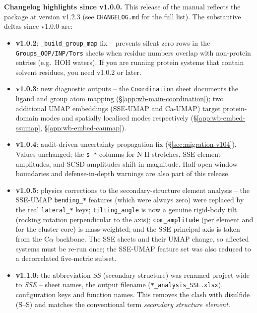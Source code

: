 \documentclass[11pt,a4paper,twoside]{article}
\theoremstyle{remark}
\begin{document}
\begin{infobox}
\textbf{Changelog highlights since v1.0.0.}
This release of the manual reflects the package at version v1.2.3
(see \texttt{CHANGELOG.md} for the full list). The substantive
deltas since v1.0.0 are:
\begin{itemize}\setlength{\itemsep}{0pt}
  \item \textbf{v1.0.2}: \texttt{\_build\_group\_map} fix --
        prevents silent zero rows in the \texttt{Groups\_OOP/INP/Tors}
        sheets when residue numbers overlap with non-protein entries
        (e.g.\ HOH waters). If you are running protein systems
        that contain solvent residues, you need v1.0.2 or later.
  \item \textbf{v1.0.3}: new diagnostic outputs -- the
        \texttt{Coordination} sheet documents the ligand and group
        atom mapping (\S\ref{app:wb-main-coordination}); two
        additional UMAP embeddings (SSE-UMAP and Ca-UMAP) target
        protein-domain modes and spatially localised modes
        respectively (\S\ref{app:wb-embed-ssumap},
        \S\ref{app:wb-embed-caumap}).
  \item \textbf{v1.0.4}: audit-driven uncertainty propagation fix
        (\S\ref{sec:migration-v104}). Values unchanged; the
        \texttt{s\_*}-columns for N-H stretches, SSE-element
        amplitudes, and SCSD amplitudes shift in magnitude.
        Half-open window boundaries and defense-in-depth warnings
        are also part of this release.
  \item \textbf{v1.0.5}: physics corrections to the secondary-structure
        element analysis -- the SSE-UMAP \texttt{bending\_*} features
        (which were always zero) were replaced by the real
        \texttt{lateral\_*} keys; \texttt{tilting\_angle} is now a genuine
        rigid-body tilt (rocking rotation perpendicular to the axis);
        \texttt{com\_amplitude} (per element and for the cluster core) is
        mass-weighted; and the SSE principal axis is taken from the
        C$\alpha$ backbone. The SSE sheets and their UMAP change, so affected
        systems must be re-run once; the SSE-UMAP feature set was also
        reduced to a decorrelated five-metric subset.
  \item \textbf{v1.1.0}: the abbreviation \emph{SS} (secondary structure)
        was renamed project-wide to \emph{SSE} -- sheet names, the output
        filename (\texttt{*\_analysis\_SSE.xlsx}), configuration keys and
        function names. This removes the clash with disulfide (S--S) and
        matches the conventional term \emph{secondary structure element}.

\end{itemize}
\end{infobox}
\end{document}

